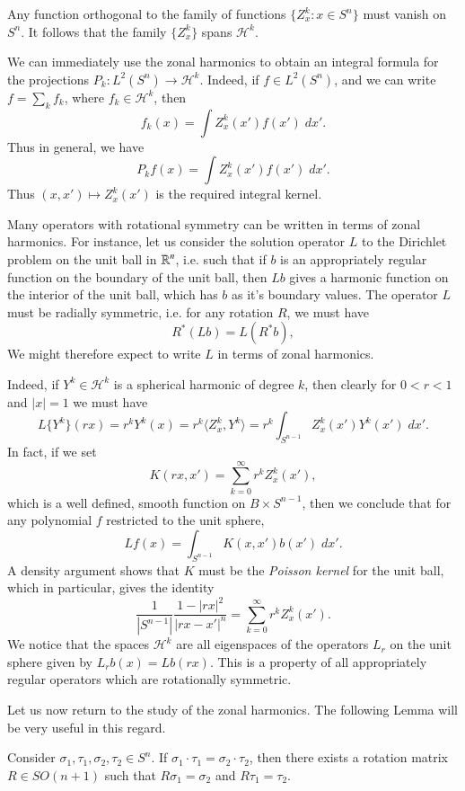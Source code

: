 Any function orthogonal to the family of functions $\{ Z^k_x : x \in S^n \}$ must vanish on $S^n$. It follows that the family $\{ Z^k_x \}$ spans $\mathcal{H}^k$.

We can immediately use the zonal harmonics to obtain an integral formula for the projections $P_k: L^2(S^n) \to \mathcal{H}^k$. Indeed, if $f \in L^2(S^n)$, and we can write $f = \sum_k f_k$, where $f_k \in \mathcal{H}^k$, then
%
\[ f_k(x) = \int Z^k_x(x') f(x')\; dx'. \]
%
Thus in general, we have
%
\[ P_k f(x) = \int Z^k_x(x') f(x')\; dx'. \]
%
Thus $(x,x') \mapsto Z^k_x(x')$ is the required integral kernel.

Many operators with rotational symmetry can be written in terms of zonal harmonics. For instance, let us consider the solution operator $L$ to the Dirichlet problem on the unit ball in $\operatorname{\mathbb{R}}^n$, i.e. such that if $b$ is an appropriately regular function on the boundary of the unit ball, then $Lb$ gives a harmonic function on the interior of the unit ball, which has $b$ as it's boundary values. The operator $L$ must be radially symmetric, i.e. for any rotation $R$, we must have
%
\[ R^*(Lb) = L(R^* b), \]
%
We might therefore expect to write $L$ in terms of zonal harmonics.

Indeed, if $Y^k \in \mathcal{H}^k$ is a spherical harmonic of degree $k$, then clearly for $0 < r < 1$ and $|x| = 1$ we must have
%
\[ L \{ Y^k \}(rx) = r^k Y^k(x) = r^k \langle Z^k_x, Y^k \rangle = r^k \int_{S^{n-1}} Z^k_x(x') Y^k(x')\; dx'. \]
%
In fact, if we set
%
\[ K(rx,x') = \sum_{k = 0}^\infty r^k Z^k_x(x'), \]
%
which is a well defined, smooth function on $B \times S^{n-1}$, then we conclude that for any polynomial $f$ restricted to the unit sphere,
%
\[ Lf(x) = \int_{S^{n-1}} K(x,x') b(x')\; dx'. \]
%
A density argument shows that $K$ must be the \emph{Poisson kernel} for the unit ball, which in particular, gives the identity
%
\[ \frac{1}{|S^{n-1}|} \frac{1 - |rx|^2}{|rx - x'|^n} = \sum_{k = 0}^\infty r^k Z^k_x(x'). \]
%
We notice that the spaces $\mathcal{H}^k$ are all eigenspaces of the operators $L_r$ on the unit sphere given by $L_r b(x) = Lb(rx)$. This is a property of all appropriately regular operators which are rotationally symmetric.

Let us now return to the study of the zonal harmonics. The following Lemma will be very useful in this regard.

\begin{lemma}
    Consider $\sigma_1, \tau_1, \sigma_2, \tau_2 \in S^n$. If $\sigma_1 \cdot \tau_1 = \sigma_2 \cdot \tau_2$, then there exists a rotation matrix $R \in SO(n+1)$ such that $R\sigma_1 = \sigma_2$ and $R\tau_1 = \tau_2$.
\end{lemma}

